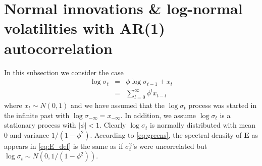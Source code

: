 \documentclass{article}
\begin{document}
\section{Normal innovations \& log-normal volatilities with AR(1)
  autocorrelation}
In this subsection we consider the case
\begin{eqnarray}
  \log \sigma_t &=& \phi\log \sigma_{t-1} + x_t \nonumber \\
  &=& \sum_{l = 0}^{\infty} \phi^l x_{t-l} \label{eq:AR}
\end{eqnarray}
where $x_t \sim N(0, 1)$ and we have assumed that the $\log \sigma_t$
process was started in the infinite past with $\log \sigma_{-\infty} =
x_{-\infty}$. In addition, we assume $\log \sigma_t$ is a stationary
process with $|\phi| < 1$. Clearly $\log \sigma_t$ is normally
distributed with mean 0 and variance ${1 / (1 -
  \phi^2)}$. According to \eqref{eq:greens}, the spectral density of
$\bm E$ as appears in \eqref{eq:E_def} is the same as if
$\sigma_t^2$'s were uncorrelated but $\log \sigma_t \sim N(0,
1/(1 - \phi^2))$.
\end{document}
